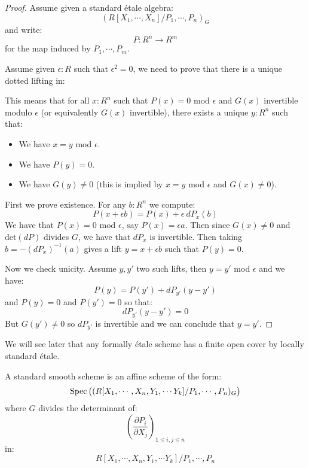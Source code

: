 \begin{proof}
Assume given a standard étale algebra:
\[(R[X_1,\cdots,X_n]/P_1,\cdots,P_n)_G\]
and write:
\[P:R^n\to R^m\]
for the map induced by $P_1,\cdots,P_m$.

Assume given $\epsilon:R$ such that $\epsilon^2=0$, we need to prove that there is a unique dotted lifting in:
  \begin{center}
    \end{center}
This means that for all $x:R^n$ such that $P(x)=0$ mod $\epsilon$ and $G(x)$ invertible modulo $\epsilon$ (or equivalently $G(x)$ invertible), there exists a unique $y:R^n$ such that:
\begin{itemize} 
\item We have $x=y$ mod $\epsilon$.
\item We have $P(y)=0$.
\item We have $G(y)\not=0$ (this is implied by $x=y$ mod $\epsilon$ and $G(x)\not=0$).
\end{itemize}

First we prove existence. For any $b:R^n$ we compute:
\[P(x+\epsilon b) = P(x) + \epsilon\ dP_x(b)\]
We have that $P(x)=0$ mod $\epsilon$, say $P(x) = \epsilon a$. Then since $G(x)\not=0$ and $\mathrm{det}(dP)$ divides $G$, we have that $dP_x$ is invertible. Then taking $b = -(dP_x)^{-1}(a)$ gives a lift $y=x+\epsilon b$ such that $P(y) = 0$.

Now we check unicity. Assume $y,y'$ two such lifts, then $y=y'$ mod $\epsilon$ and we have:
\[P(y) = P(y') + dP_{y'}(y-y')\]
and $P(y)=0$ and $P(y')=0$ so that:
\[dP_{y'}(y-y') = 0\]
But $G(y')\not=0$ so $dP_{y'}$ is invertible and we can conclude that $y=y'$.
\end{proof}

\begin{remark}
We will see later that any formally étale scheme has a finite open cover by locally standard étale. 
\end{remark}

\begin{definition}
A standard smooth scheme is an affine scheme of the form:
\[\operatorname{Spec}\big((R[X_1,\cdots,X_n,Y_1,\cdots Y_{k}] / P_1,\cdots,P_n)_G\big)\]
where $G$ divides the determinant of:
\[\left( \frac{\partial P_i}{\partial X_j}\right)_{1\leq i,j\leq n}\]
in:
\[R[X_1,\cdots,X_n,Y_1,\cdots Y_{k}] / P_1,\cdots,P_n\]
\end{definition}

